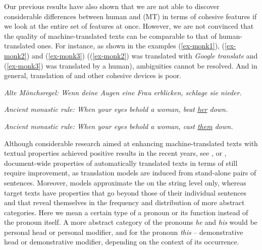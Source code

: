 \documentclass[output=paper]{langsci/langscibook.cls}
\begin{document}

Our previous results have also shown that we are not able to discover considerable differences between human and  (MT) in terms of cohesive features if we look at the entire set of features at once. However, we are not convinced that the quality of machine-translated texts can be comparable to that of human-translated ones. For instance, as shown in the examples (\ref{ex-monk1}), (\ref{ex-monk2}) and (\ref{ex-monk3}) ((\ref{ex-monk2}) was translated with \textsl{Google translate} and (\ref{ex-monk3}) was translated by a human), ambiguities cannot be resolved. And in general, translation of  and other cohesive devices is poor.


\ea
\label{ex-monk1}
 \textsl{Alte M\"onchsregel: Wenn deine Augen eine Frau erblicken, schlage sie nieder.}
\z

\ea
\label{ex-monk2}
 \textsl{Ancient monastic rule: When your eyes behold a woman, beat \underline{her} down.}
\z

\ea
\label{ex-monk3}
 \textsl{Ancient monastic rule: When your eyes behold a woman, cast \underline{them} down.}
\z

Although considerable research aimed at enhancing machine-translated texts with textual properties achieved positive results in the recent years, see \citet{DiscoMT2013}, \citet{Hardmeier2014} or \citet{MeyerHajlaouiPopescu2015}, document-wide properties of automatically translated texts in terms of  still require improvement, as translation models are induced from stand-alone pairs of sentences. Moreover,  models approximate the  on the string level only, whereas target texts have properties that go beyond those of their individual sentences and that reveal themselves in the frequency and distribution of more abstract categories. Here we mean a certain type of a pronoun or its function instead of the pronoun itself. A more abstract category of the pronouns  \textsl{he} and  \textsl{his} would be {\sc personal head} or {\sc personal modifier}, and for the pronoun  \textsl{this} -- {\sc demonstrative head} or {\sc demonstrative modifier}, depending on the context of its occurrence. 
\end{document}

